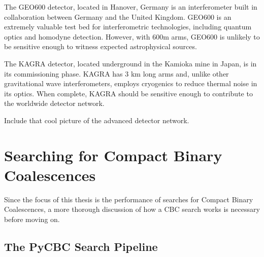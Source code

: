 The GEO600 detector, located in Hanover, Germany is an interferometer built in 
collaboration between Germany and the United Kingdom. 
GEO600 is an extremely valuable test bed for interferometric technologies,
including quantum optics and homodyne detection. However, with 600m arms, GEO600 
is unlikely to be sensitive enough to witness expected astrophysical sources.

The KAGRA detector, located underground in the Kamioka mine in Japan, 
is in its commissioning phase. KAGRA has 3 km long arms and, 
unlike other gravitational wave interferometers, employs cryogenics to 
reduce thermal noise in its optics. When complete, KAGRA should be 
sensitive enough to contribute to the worldwide detector network.

Include that cool picture of the advanced detector network.

\section{Searching for Compact Binary Coalescences}\label{sec:cbc-search}

Since the focus of this thesis is the performance of searches for Compact 
Binary Coalescences, a more thorough discussion of how a CBC search 
works is necessary before moving on. 

\subsection{The PyCBC Search Pipeline}

